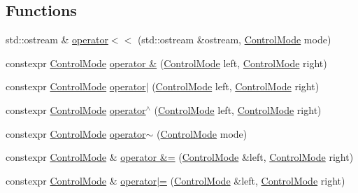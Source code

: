 \subsection*{Functions}
\begin{DoxyCompactItemize}
\item 
std\+::ostream \& \hyperlink{namespacefranka__hw_a2dbef19b15b26447214b95ccc0973b20}{operator$<$$<$} (std\+::ostream \&ostream, \hyperlink{namespacefranka__hw_afa416558ce4baace5ac6c71bd5d2c98c}{Control\+Mode} mode)
\item 
constexpr \hyperlink{namespacefranka__hw_afa416558ce4baace5ac6c71bd5d2c98c}{Control\+Mode} \hyperlink{namespacefranka__hw_a4f7ed8f97d695218717ee59ea579b5b0}{operator \&} (\hyperlink{namespacefranka__hw_afa416558ce4baace5ac6c71bd5d2c98c}{Control\+Mode} left, \hyperlink{namespacefranka__hw_afa416558ce4baace5ac6c71bd5d2c98c}{Control\+Mode} right)
\item 
constexpr \hyperlink{namespacefranka__hw_afa416558ce4baace5ac6c71bd5d2c98c}{Control\+Mode} \hyperlink{namespacefranka__hw_aa04e36b77fe247b4ef736bb0abc2ac24}{operator$\vert$} (\hyperlink{namespacefranka__hw_afa416558ce4baace5ac6c71bd5d2c98c}{Control\+Mode} left, \hyperlink{namespacefranka__hw_afa416558ce4baace5ac6c71bd5d2c98c}{Control\+Mode} right)
\item 
constexpr \hyperlink{namespacefranka__hw_afa416558ce4baace5ac6c71bd5d2c98c}{Control\+Mode} \hyperlink{namespacefranka__hw_a8270a1f589cc045ec58e8b44e0f307f2}{operator$^\wedge$} (\hyperlink{namespacefranka__hw_afa416558ce4baace5ac6c71bd5d2c98c}{Control\+Mode} left, \hyperlink{namespacefranka__hw_afa416558ce4baace5ac6c71bd5d2c98c}{Control\+Mode} right)
\item 
constexpr \hyperlink{namespacefranka__hw_afa416558ce4baace5ac6c71bd5d2c98c}{Control\+Mode} \hyperlink{namespacefranka__hw_afb4d4bc5509c24838d523b6f8d90b58a}{operator$\sim$} (\hyperlink{namespacefranka__hw_afa416558ce4baace5ac6c71bd5d2c98c}{Control\+Mode} mode)
\item 
constexpr \hyperlink{namespacefranka__hw_afa416558ce4baace5ac6c71bd5d2c98c}{Control\+Mode} \& \hyperlink{namespacefranka__hw_a440231bfa3ba7c63421f78b81a3f1977}{operator \&=} (\hyperlink{namespacefranka__hw_afa416558ce4baace5ac6c71bd5d2c98c}{Control\+Mode} \&left, \hyperlink{namespacefranka__hw_afa416558ce4baace5ac6c71bd5d2c98c}{Control\+Mode} right)
\item 
constexpr \hyperlink{namespacefranka__hw_afa416558ce4baace5ac6c71bd5d2c98c}{Control\+Mode} \& \hyperlink{namespacefranka__hw_a8763373676dcb02e2c2ac1f4e7613a8d}{operator$\vert$=} (\hyperlink{namespacefranka__hw_afa416558ce4baace5ac6c71bd5d2c98c}{Control\+Mode} \&left, \hyperlink{namespacefranka__hw_afa416558ce4baace5ac6c71bd5d2c98c}{Control\+Mode} right)

\end{DoxyCompactItemize}
